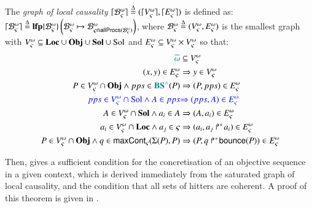 \begin{definition}
\label{def:glc}
  The \emph{ graph of local causality} $\cwB \DEF (\Bv, \Be)$ is defined as:
  $\cwB \DEF \lfp{\aB^\w_\ctx}{\myB}{\aB^\w_{\ctx \Cap \allprocs(\myB)}}$,
  where $\myB \DEF (\cwV, \cwE)$ is the smallest graph with
  $\cwV \subseteq \Proc \cup \Obj \cup \sSol \cup \Sol$ and $\cwE \subseteq \cwV \times \cwV$
  so that:
  \begin{align}
    \modMF{\toset{\w}} &\subseteq \cwV \label{eq:Vw} \\
    (x, y) \in \cwE &\Rightarrow y \in \cwV \label{eq:VE} \\
    P \in \cwVObj \wedge pps \in \modMF{\aBS}(P) &\Rightarrow (P, pps) \in \cwE \label{eq:ESol1} \\
    \moda{pps \in \cwVSol \wedge A \in pps} &\moda{\Rightarrow (pps, A) \in \cwE} \label{eq:ESol3} \\
    A \in \cwVsSol \wedge a_i \in A &\Rightarrow (A, a_i) \in \cwE \label{eq:ESol2} \\
    a_i \in \cwVProc \wedge a_j \in \ctx &\Rightarrow (a_i, \PHobjp{a}{j}{i}) \in \cwE \label{eq:EReq} \\
    P \in \cwVObj \wedge q \in \gCont_\ctx(\PHsort(P), P) &\Rightarrow (P, \PHobj{q}{\PHbounce(P)}) \in \cwE \label{eq:ECont} \!
  \end{align}
\end{definition}

Then,  gives a sufficient condition for the concretisation
of an objective sequence in a given context,
which is derived immediately from the saturated graph of local causality,
and the condition that all sets of hitters are coherent.
A proof of this theorem is given in .
\begin{definition}
\label{def:coherent}
\end{definition}

